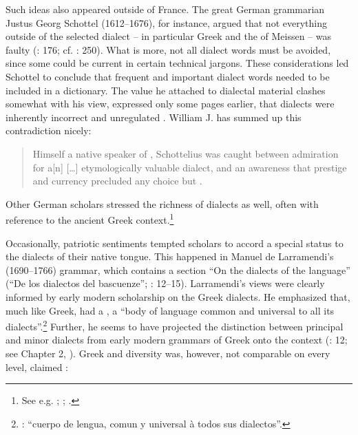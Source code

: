 Such ideas also appeared outside of France. The great German grammarian Justus Georg Schottel (1612–1676), for instance, argued that not everything outside of the selected dialect – in particular  Greek and the  of Meissen – was faulty (\citealt{Schottel1663}: 176; cf. \citealt{Roelcke2014}: 250). What is more, not all dialect words must be avoided, since some could be current in certain technical jargons. These considerations led Schottel to conclude that frequent and important dialect words needed to be included in a dictionary. The value he attached to dialectal material clashes somewhat with his view, expressed only some pages earlier, that dialects were inherently incorrect and unregulated \citep[174]{Schottel1663}. William J. \citet[1110]{Jones2001} has summed up this contradiction nicely:

\begin{quote}
Himself a native speaker of , Schottelius was caught between admiration for a[n] […] etymologically valuable dialect, and an awareness that prestige and currency precluded any choice but .
\end{quote}

Other German scholars stressed the richness of  dialects as well, often with reference to the ancient Greek context.\footnote{See e.g. \citet[\textsc{a.3}\textsc{\textsuperscript{r}}\textsc{–a.3}\textsc{\textsuperscript{v}}]{Chytraeus1582}; \citet[\textsc{c.1}\textsc{\textsuperscript{r}}]{Meisner1705}; \citet[73]{Hertling1708}.}

Occasionally, patriotic sentiments tempted scholars to accord a special status to the dialects of their native  tongue. This happened in Manuel de Larramendi’s (1690–1766)  grammar, which contains a section “On the dialects of the  language” (“De los dialectos del bascuenze”; \citealt{Larramendi1729}: 12–15). Larramendi’s views were clearly informed by early modern scholarship on the Greek dialects. He emphasized that, much like Greek,  had a , a “body of language common and universal to all its dialects”.\footnote{\citet[12--13]{Larramendi1729}: “cuerpo de lengua, comun y universal à todos sus dialectos”.} Further, he seems to have projected the distinction between principal and minor dialects from early modern grammars of Greek onto the  context (\citealt{Larramendi1729}: 12; see Chapter 2, ). Greek and  diversity was, however, not comparable on every level, claimed \citet[12]{Larramendi1729}:

